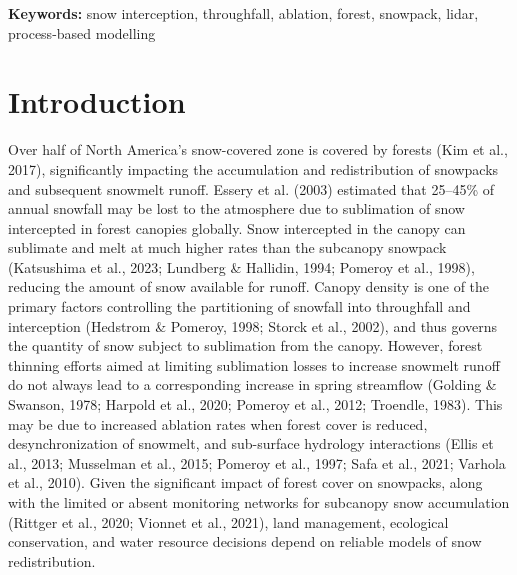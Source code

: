 \documentclass[
  letterpaper,
  DIV=11,
  numbers=noendperiod]{scrartcl}
\begin{document}
\textbf{Keywords:} snow interception, throughfall, ablation, forest,
snowpack, lidar, process-based modelling

\section{Introduction}\label{introduction}

Over half of North America's snow-covered zone is covered by forests
(Kim et al., 2017), significantly impacting the accumulation and
redistribution of snowpacks and subsequent snowmelt runoff. Essery et
al. (2003) estimated that 25--45\% of annual snowfall may be lost to the
atmosphere due to sublimation of snow intercepted in forest canopies
globally. Snow intercepted in the canopy can sublimate and melt at much
higher rates than the subcanopy snowpack (Katsushima et al., 2023;
Lundberg \& Hallidin, 1994; Pomeroy et al., 1998), reducing the amount
of snow available for runoff. Canopy density is one of the primary
factors controlling the partitioning of snowfall into throughfall and
interception (Hedstrom \& Pomeroy, 1998; Storck et al., 2002), and thus
governs the quantity of snow subject to sublimation from the canopy.
However, forest thinning efforts aimed at limiting sublimation losses to
increase snowmelt runoff do not always lead to a corresponding increase
in spring streamflow (Golding \& Swanson, 1978; Harpold et al., 2020;
Pomeroy et al., 2012; Troendle, 1983). This may be due to increased
ablation rates when forest cover is reduced, desynchronization of
snowmelt, and sub-surface hydrology interactions (Ellis et al., 2013;
Musselman et al., 2015; Pomeroy et al., 1997; Safa et al., 2021; Varhola
et al., 2010). Given the significant impact of forest cover on
snowpacks, along with the limited or absent monitoring networks for
subcanopy snow accumulation (Rittger et al., 2020; Vionnet et al.,
2021), land management, ecological conservation, and water resource
decisions depend on reliable models of snow redistribution.
\end{document}
